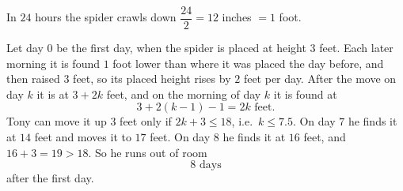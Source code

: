 In $24$ hours the spider crawls down $\dfrac{24}{2}=12$ inches $=1$ foot.

Let day $0$ be the first day, when the spider is placed at height $3$ feet. Each later morning it is found $1$ foot lower than where it was placed the day before, and then raised $3$ feet, so its placed height rises by $2$ feet per day. After the move on day $k$ it is at $3+2k$ feet, and on the morning of day $k$ it is found at
\[
3+2(k-1)-1=2k\text{ feet}.
\]
Tony can move it up $3$ feet only if $2k+3\le18$, i.e.\ $k\le7.5$. On day $7$ he finds it at $14$ feet and moves it to $17$ feet. On day $8$ he finds it at $16$ feet, and $16+3=19>18$. So he runs out of room
\[
\boxed{8\text{ days}}
\]
after the first day.
